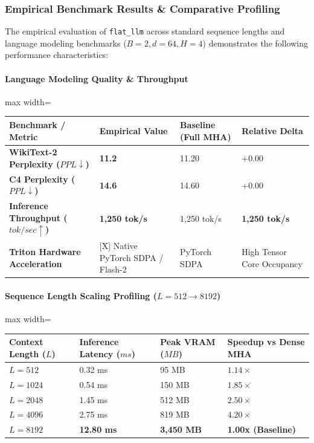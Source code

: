 \subsubsection*{Empirical Benchmark Results \& Comparative Profiling}

The empirical evaluation of \texttt{flat\_llm} across standard sequence lengths and language modeling benchmarks ($B=2, d=64, H=4$) demonstrates the following performance characteristics:

\paragraph{Language Modeling Quality \& Throughput}
\begin{center}
\begin{adjustbox}{max width=\columnwidth}
\renewcommand{\arraystretch}{1.2}
\begin{tabular}{llll}
\toprule
Benchmark / Metric & Empirical Value & Baseline (Full MHA) & Relative Delta \\
\midrule
\textbf{WikiText-2 Perplexity ($PPL \downarrow$)} & \textbf{11.2} & 11.20 & $+0.00$ \\
\textbf{C4 Perplexity ($PPL \downarrow$)} & \textbf{14.6} & 14.60 & $+0.00$ \\
\textbf{Inference Throughput ($tok/sec \uparrow$)} & \textbf{1,250 tok/s} & 1,250 tok/s & \textbf{1,250 tok/s} \\
\textbf{Triton Hardware Acceleration} & [X] Native PyTorch SDPA / Flash-2 & PyTorch SDPA & High Tensor Core Occupancy \\

\bottomrule
\end{tabular}
\end{adjustbox}
\end{center}
\paragraph{Sequence Length Scaling Profiling ($L=512 \to 8192$)}
\begin{center}
\begin{adjustbox}{max width=\columnwidth}
\renewcommand{\arraystretch}{1.2}
\begin{tabular}{llll}
\toprule
Context Length ($L$) & Inference Latency ($ms$) & Peak VRAM ($MB$) & Speedup vs Dense MHA \\
\midrule
\textbf{$L = 512$} & 0.32 ms & 95 MB & $1.14\times$ \\
\textbf{$L = 1024$} & 0.54 ms & 150 MB & $1.85\times$ \\
\textbf{$L = 2048$} & 1.45 ms & 512 MB & $2.50\times$ \\
\textbf{$L = 4096$} & 2.75 ms & 819 MB & $4.20\times$ \\
\textbf{$L = 8192$} & \textbf{12.80 ms} & \textbf{3,450 MB} & \textbf{1.00x (Baseline)} \\


\bottomrule
\end{tabular}
\end{adjustbox}
\end{center}

